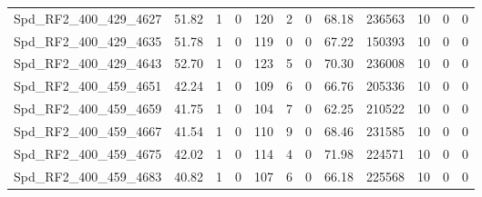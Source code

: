 \begin{longtable}[c]{@{}lrrrrrrrrrrr@{}}
Spd\_RF2\_400\_429\_4627      & 51.82                  & 1                       & 0                       & 120                    & 2                       & 0                       & 68.18                   & 236563                   & 10                       & 0                        & 0                        \\
Spd\_RF2\_400\_429\_4635      & 51.78                  & 1                       & 0                       & 119                    & 0                       & 0                       & 67.22                   & 150393                   & 10                       & 0                        & 0                        \\
Spd\_RF2\_400\_429\_4643      & 52.70                  & 1                       & 0                       & 123                    & 5                       & 0                       & 70.30                   & 236008                   & 10                       & 0                        & 0                        \\
Spd\_RF2\_400\_459\_4651      & 42.24                  & 1                       & 0                       & 109                    & 6                       & 0                       & 66.76                   & 205336                   & 10                       & 0                        & 0                        \\
Spd\_RF2\_400\_459\_4659      & 41.75                  & 1                       & 0                       & 104                    & 7                       & 0                       & 62.25                   & 210522                   & 10                       & 0                        & 0                        \\
Spd\_RF2\_400\_459\_4667      & 41.54                  & 1                       & 0                       & 110                    & 9                       & 0                       & 68.46                   & 231585                   & 10                       & 0                        & 0                        \\
Spd\_RF2\_400\_459\_4675      & 42.02                  & 1                       & 0                       & 114                    & 4                       & 0                       & 71.98                   & 224571                   & 10                       & 0                        & 0                        \\
Spd\_RF2\_400\_459\_4683      & 40.82                  & 1                       & 0                       & 107                    & 6                       & 0                       & 66.18                   & 225568                   & 10                       & 0                        & 0                        \\

\end{longtable}
